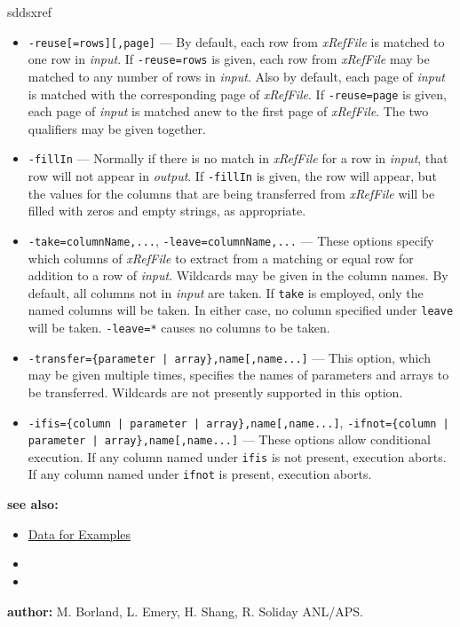\begin{sddsprog}{sddsxref}
\begin{itemize}
      \item \verb|-reuse[=rows][,page]| --- By default, each row from \emph{xRefFile} is matched to one row in
        \emph{input}. If \verb|-reuse=rows| is given, each row from \emph{xRefFile} may be matched to any
        number of rows in \emph{input}. Also by default, each page of \emph{input} is matched with the
        corresponding page of \emph{xRefFile}. If \verb|-reuse=page| is given, each page of \emph{input}
        is matched anew to the first page of \emph{xRefFile}. The two qualifiers may be given together.
      \item \verb|-fillIn| --- Normally if there is no match in \emph{xRefFile} for a row in \emph{input},
        that row will not appear in \emph{output}. If \verb|-fillIn| is given, the row will appear, but the
        values for the columns that are being transferred from \emph{xRefFile} will be filled with zeros
        and empty strings, as appropriate.
      \item \verb|-take=columnName,...|, \verb|-leave=columnName,...| --- These options specify which columns
        of \emph{xRefFile} to extract from a matching or equal row for addition to a row of \emph{input}.
        Wildcards may be given in the column names. By default, all columns not in \emph{input} are taken.
        If \verb|take| is employed, only the named columns will be taken. In either case, no column
        specified under \verb|leave| will be taken. \verb|-leave=*| causes no columns to be taken.
      \item \verb!-transfer={parameter | array},name[,name...]! --- This option, which may be given
        multiple times, specifies the names of parameters and arrays to be transferred. Wildcards are not
        presently supported in this option.
      \item \verb!-ifis={column | parameter | array},name[,name...]!, \verb!-ifnot={column | parameter | array},name[,name...]! --- These options allow conditional execution. If any
        column named under \verb|ifis| is not present, execution aborts. If any column named under
        \verb|ifnot| is present, execution aborts.
    \end{itemize}
  \item \textbf{see also:}
    \begin{itemize}
      \item \hyperref[exampleData]{Data for Examples}
      \item {}
      \item {}
    \end{itemize}
  \item \textbf{author:} M. Borland, L. Emery, H. Shang, R. Soliday ANL/APS.
\end{sddsprog}

